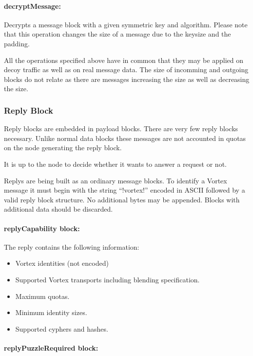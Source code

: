 \paragraph{decryptMessage:} Decrypts a message block with a given symmetric key and algorithm. Please note that this operation changes the size of a message due to the keysize and the padding.

All the operations specified above have in common that they may be applied on decoy traffic as well as on real message data. The size of incomming and outgoing blocks do not relate as there are messages increasing the size as well as decreasing the size.

\subsubsection{Reply Block}
Reply blocks are embedded in payload blocks. There are very few reply blocks necessary. Unlike normal data blocks these messages are not accounted in quotas on the node generating the reply block. 

It is up to the node to decide whether it wants to answer a request or not.

Replys are being built as an ordinary message blocks. To identify a Vortex message it must begin with the string ``!vortex!'' encoded in ASCII followed by a valid reply block structure. No additional bytes may be appended. Blocks with additional data should be discarded.


\paragraph{replyCapability block:}
The reply contains the following information:
\begin{itemize}
	\item Vortex identities (not encoded)
	\item Supported Vortex transports including blending specification.
	\item Maximum quotas.
	\item Minimum identity sizes.
	\item Supported cyphers and hashes.
\end{itemize}

\paragraph{replyPuzzleRequired block:}

